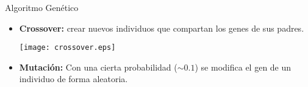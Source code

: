 \documentclass[center,10pt,cm]{beamer}
\begin{document}
\begin{frame}{Algoritmo Gen\'etico}
\begin{itemize}
{\begin{description}

    \end{description}
    }

    \item {\bf Crossover:} crear nuevos individuos que compartan los genes de sus padres.

      \begin{center}
      \texttt{[image: crossover.eps]}
      \end{center}

    \item {\bf Mutaci\'on:} Con una cierta probabilidad ($\sim 0.1$) se modifica el gen de un individuo de forma aleatoria.


  \end{itemize}
\end{frame}
\end{document}
